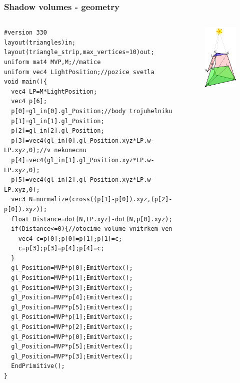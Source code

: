 \begin{frame}[fragile]\frametitle{Shadow volumes - geometry}\tiny
  \begin{columns}[T]
    \begin{column}{.44\textwidth}
\begin{verbatim}
#version 330
layout(triangles)in;
layout(triangle_strip,max_vertices=10)out;
uniform mat4 MVP,M;//matice
uniform vec4 LightPosition;//pozice svetla
void main(){
  vec4 LP=M*LightPosition;
  vec4 p[6];
  p[0]=gl_in[0].gl_Position;//body trojuhelniku
  p[1]=gl_in[1].gl_Position;
  p[2]=gl_in[2].gl_Position;
  p[3]=vec4(gl_in[0].gl_Position.xyz*LP.w-LP.xyz,0);//v nekonecnu
  p[4]=vec4(gl_in[1].gl_Position.xyz*LP.w-LP.xyz,0);
  p[5]=vec4(gl_in[2].gl_Position.xyz*LP.w-LP.xyz,0);
  vec3 N=normalize(cross((p[1]-p[0]).xyz,(p[2]-p[0]).xyz));
  float Distance=dot(N,LP.xyz)-dot(N,p[0].xyz);
  if(Distance<=0){//otocime volume vnitrkem ven
    vec4 c=p[0];p[0]=p[1];p[1]=c;
    c=p[3];p[3]=p[4];p[4]=c;
  }
  gl_Position=MVP*p[0];EmitVertex();
  gl_Position=MVP*p[1];EmitVertex();
  gl_Position=MVP*p[3];EmitVertex();
  gl_Position=MVP*p[4];EmitVertex();
  gl_Position=MVP*p[5];EmitVertex();
  gl_Position=MVP*p[1];EmitVertex();
  gl_Position=MVP*p[2];EmitVertex();
  gl_Position=MVP*p[0];EmitVertex();
  gl_Position=MVP*p[5];EmitVertex();
  gl_Position=MVP*p[3];EmitVertex();
  EndPrimitive();
}
\end{verbatim}
    \end{column}
    \begin{column}{.48\textwidth}
      \begin{figure}[h]
        \includegraphics[width=3cm,keepaspectratio]{pics/shadows/shadowVolumes/perTriangle.pdf}
      \end{figure}
    \end{column}
  \end{columns}

\end{frame}

